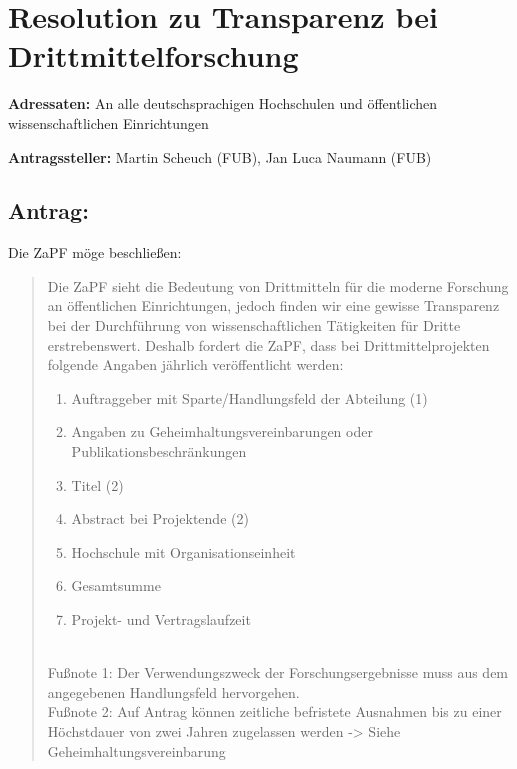 \documentclass[10pt,oneside]{scrartcl}
\begin{document}
\section*{Resolution zu Transparenz bei Drittmittelforschung}

\textbf{Adressaten:} An alle deutschsprachigen Hochschulen und öffentlichen wissenschaftlichen Einrichtungen

\textbf{Antragssteller:} Martin Scheuch (FUB), Jan Luca Naumann (FUB)

\subsection*{Antrag:}
Die ZaPF möge beschließen:
\begin{quote}
Die ZaPF sieht die Bedeutung von Drittmitteln für die moderne Forschung an öffentlichen Einrichtungen, jedoch finden wir eine gewisse Transparenz bei der Durchführung von wissenschaftlichen Tätigkeiten für Dritte erstrebenswert. Deshalb fordert die ZaPF, dass bei Drittmittelprojekten folgende Angaben jährlich veröffentlicht werden:
\begin{enumerate}
\item Auftraggeber mit Sparte/Handlungsfeld der Abteilung (1)
\item Angaben zu Geheimhaltungsvereinbarungen oder Publikationsbeschränkungen
\item Titel (2)
\item Abstract bei Projektende (2)
\item Hochschule mit Organisationseinheit
\item Gesamtsumme
\item Projekt- und Vertragslaufzeit 
\end{enumerate}
~\\
Fußnote 1: Der Verwendungszweck der Forschungsergebnisse muss aus dem angegebenen Handlungsfeld hervorgehen.\\

Fußnote 2: Auf Antrag können zeitliche befristete Ausnahmen bis zu einer Höchstdauer von zwei Jahren zugelassen werden -> Siehe Geheimhaltungsvereinbarung\\


\end{quote}
\end{document}
